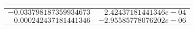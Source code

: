 \begin{table}[!tbp]
\begin{center}
\begin{tabular}{rr}
\hline\hline
\multicolumn{1}{c}{}&\multicolumn{1}{c}{}\tabularnewline
\hline
$-0.033798187359934673$&$ 2.42437181441346e-04$\tabularnewline
$ 0.000242437181441346$&$-2.95585778076202e-06$\tabularnewline
\hline
\end{tabular}\end{center}\end{table}

